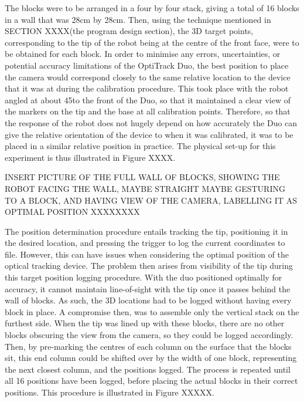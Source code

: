 \documentclass[11pt]{article}
\begin{document}
The blocks were to be arranged in a four by four stack, giving a total of 16 blocks in a wall that was 28cm by 28cm. Then, using the technique mentioned in SECTION XXXX(the program design section), the 3D target points, corresponding to the tip of the robot being at the centre of the front face, were to be obtained for each block. In order to minimise any errors, uncertainties, or potential accuracy limitations of the OptiTrack Duo, the best position to place the camera would correspond closely to the same relative location to the device that it was at during the calibration procedure. This took place with the robot angled at about 45\degree to the front of the Duo, so that it maintained a clear view of the markers on the tip and the base at all calibration points. Therefore, so that the response of the robot does not hugely depend on how accurately the Duo can give the relative orientation of the device to when it was calibrated, it was to be placed in a similar relative position in practice. The physical set-up for this experiment is thus illustrated in Figure XXXX.


INSERT PICTURE OF THE FULL WALL OF BLOCKS, SHOWING THE ROBOT FACING THE WALL, MAYBE STRAIGHT MAYBE GESTURING TO A BLOCK, AND HAVING VIEW OF THE CAMERA, LABELLING IT AS OPTIMAL POSITION XXXXXXXX




The position determination procedure entails tracking the tip, positioning it in the desired location, and pressing the trigger to log the current coordinates to file. However, this can have issues when considering the optimal position of the optical tracking device. The problem then arises from visibility of the tip during this target position logging procedure. With the duo positioned optimally for accuracy, it cannot maintain line-of-sight with the tip once it passes behind the wall of blocks. As such, the 3D locations had to be logged without having every block in place. A compromise then, was to assemble only the vertical stack on the furthest side. When the tip was lined up with these blocks, there are no other blocks obscuring the view from the camera, so they could be logged accordingly. Then, by pre-marking the centres of each column on the surface that the blocks sit, this end column could be shifted over by the width of one block, representing the next closest column, and the positions logged. The process is repeated until all 16 positions have been logged, before placing the actual blocks in their correct positions. This procedure is illustrated in Figure XXXXX.
\end{document}
